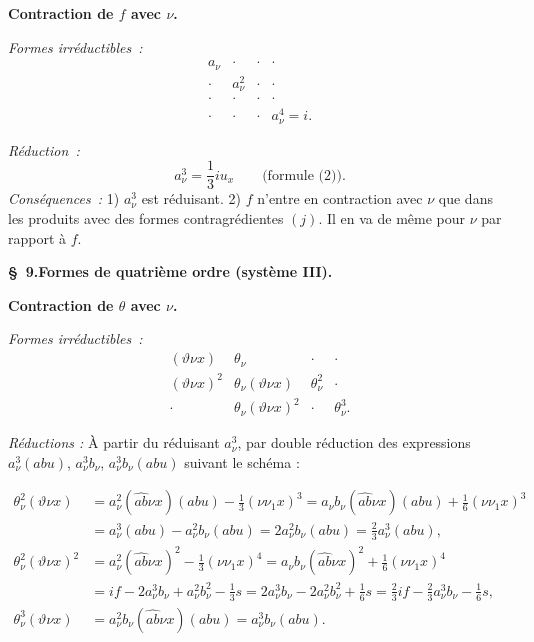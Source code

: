 \documentclass[11pt]{article}
\begin{document}
\noindent\textbf{Contraction de $f$ avec $\nu$.}

\noindent\emph{Formes irréductibles :}
\[
\begin{array}{cccc}
a_\nu&\cdot&\cdot&\cdot\\
\cdot&a_\nu^2&\cdot&\cdot\\
\cdot&\cdot&\cdot&\cdot\\
\cdot&\cdot&\cdot&a_\nu^4=i.
\end{array}
\]

\noindent\emph{Réduction :}
\[
a_\nu^3=\frac13 i u_x\qquad\text{(formule (2)).}
\]
\noindent\emph{Conséquences :} 1) $a_\nu^3$ est réduisant. 2) $f$ n'entre en contraction avec $\nu$ que dans les produits avec des formes contragrédientes $(j)$. Il en va de même pour $\nu$ par rapport à $f$.

\begin{center}
\textbf{\S\ 9.\quad Formes de quatrième ordre (système III).}
\end{center}

\noindent\textbf{Contraction de $\theta$ avec $\nu$.}

\noindent\emph{Formes irréductibles :}
\[
\begin{array}{cccc}
(\vartheta\nu x)&\theta_\nu&\cdot&\cdot\\
(\vartheta\nu x)^2&\theta_\nu(\vartheta\nu x)&\theta_\nu^2&\cdot\\
\cdot&\theta_\nu(\vartheta\nu x)^2&\cdot&\theta_\nu^3.
\end{array}
\]

\noindent\emph{Réductions :} À partir du réduisant $a_\nu^3$, par double réduction des expressions $a_\nu^3(abu)$, $a_\nu^3b_\nu$, $a_\nu^3b_\nu(abu)$ suivant le schéma :

\[
\begin{aligned}
\theta_\nu^2(\vartheta\nu x)
&=a_\nu^2(\widehat{ab}\nu x)(abu)-\frac13(\nu\nu_1x)^3=a_\nu b_\nu(\widehat{ab}\nu x)(abu)+\frac16(\nu\nu_1x)^3\\
&=a_\nu^3(abu)-a_\nu^2b_\nu(abu)=2a_\nu^2b_\nu(abu)=\frac23a_\nu^3(abu),\\[.4em]
\theta_\nu^2(\vartheta\nu x)^2
&=a_\nu^2(\widehat{ab}\nu x)^2-\frac13(\nu\nu_1x)^4=a_\nu b_\nu(\widehat{ab}\nu x)^2+\frac16(\nu\nu_1x)^4\\
&=if-2a_\nu^3b_\nu+a_\nu^2b_\nu^2-\frac13s=2a_\nu^3b_\nu-2a_\nu^2b_\nu^2+\frac16s=\frac23if-\frac23a_\nu^3b_\nu-\frac16s,\\[.4em]
\theta_\nu^3(\vartheta\nu x)&=a_\nu^2b_\nu(\widehat{ab}\nu x)(abu)=a_\nu^3b_\nu(abu).
\end{aligned}
\]
\end{document}
